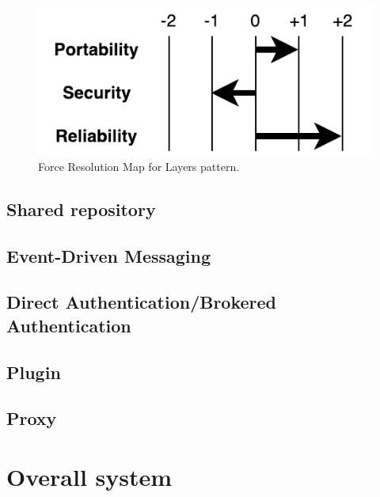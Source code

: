 \begin{figure}[H]
\centering
\includegraphics[scale=0.7]{6-evaluation/images/layers_frm.pdf}
\caption{Force Resolution Map for Layers pattern.}
\label{fig:layers-frm}
\end{figure}

\subsection{Shared repository}
\subsection{Event-Driven Messaging}
\subsection{Direct Authentication/Brokered Authentication}
\subsection{Plugin}
\subsection{Proxy}

\section{Overall system}